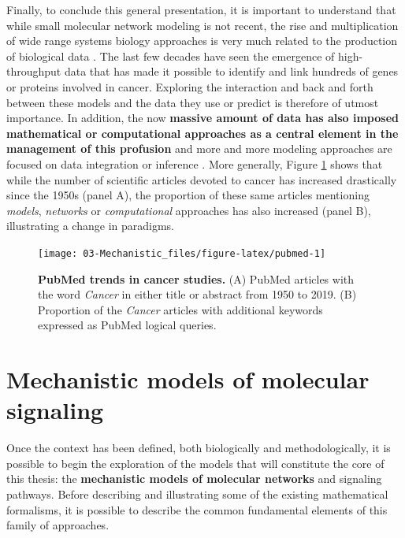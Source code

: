 \documentclass[a4paper,12pt,twoside,onecolumn,openright,final,oldfontcommands]{memoir}
\begin{document}
Finally, to conclude this general presentation, it is important to
understand that while small molecular network modeling is not recent,
the rise and multiplication of wide range systems biology approaches is
very much related to the production of biological data
\citep{de2002modeling}. The last few decades have seen the emergence of
high-throughput data that has made it possible to identify and link
hundreds of genes or proteins involved in cancer. Exploring the
interaction and back and forth between these models and the data they
use or predict is therefore of utmost importance. In addition, the now
\textbf{massive amount of data has also imposed mathematical or
computational approaches as a central element in the management of this
profusion} and more and more modeling approaches are focused on data
integration or inference
\citep{frohlich2018efficient, bouhaddou2018mechanistic}. More generally,
Figure \ref{fig:pubmed} shows that while the number of scientific
articles devoted to cancer has increased drastically since the 1950s
(panel A), the proportion of these same articles mentioning
\emph{models}, \emph{networks} or \emph{computational} approaches has
also increased (panel B), illustrating a change in paradigms.

\begin{figure}

{\centering \texttt{[image: 03-Mechanistic\_files/figure-latex/pubmed-1]} 

}

\caption[PubMed trends in cancer studies.]{\textbf{PubMed trends in cancer studies.} (A)
PubMed articles with the word \emph{Cancer} in either title or abstract
from 1950 to 2019. (B) Proportion of the \emph{Cancer} articles with
additional keywords expressed as PubMed logical queries.}\label{fig:pubmed}
\end{figure}






\section{Mechanistic models of molecular
signaling}\label{mechanistic-models-of-molecular-signaling}

Once the context has been defined, both biologically and
methodologically, it is possible to begin the exploration of the models
that will constitute the core of this thesis: the \textbf{mechanistic
models of molecular networks} and signaling pathways. Before describing
and illustrating some of the existing mathematical formalisms, it is
possible to describe the common fundamental elements of this family of
approaches.
\end{document}
